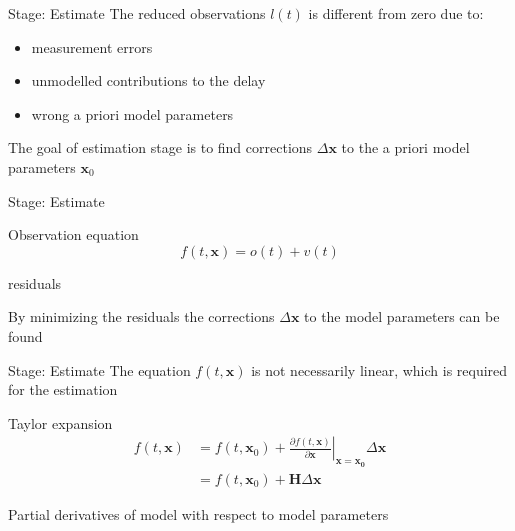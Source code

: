 \documentclass[14pt,table,t, c]{beamer}
\begin{document}
\begin{frame}{Stage: Estimate}
The reduced observations $l(t)$ is different from zero due to:
\begin{itemize}
  \item measurement errors
  \item unmodelled contributions to the delay
  \item wrong a priori model parameters
\end{itemize}
\vspace*{\baselineskip}
The goal of estimation stage is to find corrections $\Delta\mathbf{x}$ to the a priori model parameters $\mathbf{x}_0$
\end{frame}

\begin{frame}{Stage: Estimate}
\begin{block}{Observation equation}
\vspace*{-\baselineskip}\setlength\belowdisplayskip{0pt}\setlength\abovedisplayskip{0pt}
\begin{equation*}
f(t, \mathbf{x}) = o(t) + v(t)
\end{equation*}
\end{block}
\begin{description}[$v(t)$]
\item[$v(t)$] residuals
\end{description}
\vspace*{\baselineskip}
By minimizing the residuals the corrections $\Delta\mathbf{x}$ to the model parameters can be found
\end{frame}

\begin{frame}{Stage: Estimate}
The equation $f(t,\mathbf{x})$ is not necessarily linear, which is required for the estimation
\vspace*{\baselineskip}
\begin{block}{Taylor expansion}
\vspace*{-\baselineskip}\setlength\belowdisplayskip{0pt}\setlength\abovedisplayskip{0pt}
\begin{align*}
f(t,\mathbf{x}) &= f(t,\mathbf{x}_0) + \left.\frac{\partial f(t, \mathbf{x})}{\partial
\mathbf{x}}\right|_{\mathbf{x}=\mathbf{x_0}}\Delta\mathbf{x} \\
                &= f(t,\mathbf{x}_0) + \mathbf{H}\Delta\mathbf{x}
\end{align*}
\end{block}
\begin{description}[$\mathbf{A}$]
\item[$\mathbf{H}$] Partial derivatives of model with respect to model parameters
\end{description}
\end{frame}
\end{document}

